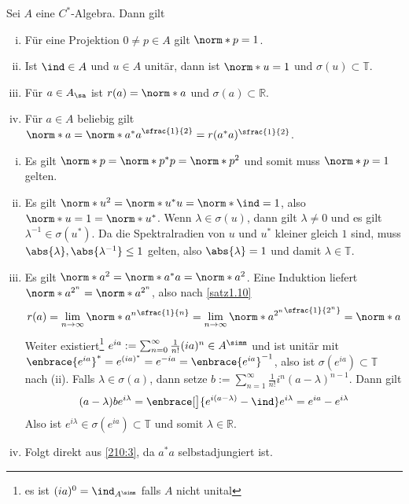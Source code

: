 \begin{proposition}[label=prop:210,{name=[Eigenschaften von Projektionen, unitären und selbstadjungierten Elementen]}]
	Sei $A$ eine $C^*$-Algebra. Dann gilt
	\begin{enumerate}[(i),itemsep=0pt]
		\item Für eine Projektion $0 \neq p  \in A$ gilt $\norm*{p} =1$.
		\item Ist $\ind \in A$ und $u \in A$ unitär, dann ist $\norm*{u}=1$ und $\sigma(u) \subset \mathbb{T}$.
		\item \label{210:3} Für $a \in A_{\sa}$ ist $r(a)= \norm*{a}$ und $\sigma(a) \subset \mathbb{R}$.
		\item \label{210:4} Für $a \in A$ beliebig gilt $\norm*{a} = \norm*{a^* a}^{\sfrac{1}{2}}= r(a^* a)^{\sfrac{1}{2}}$.
	\end{enumerate}
\end{proposition}
\begin{beweis}
	\leavevmode
	\begin{enumerate}[(i),itemsep=0pt]
		\item Es gilt $\norm*{p} = \norm*{p^*p}= \norm*{p}^2$ und somit muss $\norm*{p}=1$ gelten.
		\item Es gilt $\norm*{u}^2= \norm*{u^* u}= \norm*{\ind}=1$, also $\norm*{u}=1=\norm*{u^*}$. 
		Wenn $\lambda \in \sigma(u)$, dann gilt $\lambda \neq 0$ und es gilt $\lambda^{-1} \in \sigma(u^*)$. 
		Da die Spektralradien von $u$ und $u^*$ kleiner gleich $1$ sind, muss $\abs{\lambda},\abs{\lambda^{-1}}\le 1$ gelten, also $\abs{\lambda}=1$ und damit $\lambda \in \mathbb{T}$.
		\item Es gilt $\norm*{a^2}= \norm*{a^* a}= \norm*{a}^2$. Eine Induktion liefert $\norm*{a^{2^n}}= \norm*{a}^{2^n}$, also nach \autoref{satz1.10} 
		\[
			r(a) = \lim_{n \to \infty} \norm*{a^n}^{\sfrac{1}{n}} = \lim_{n \to \infty} \norm*{a^{2^n}}^{\sfrac{1}{2^n}} = \norm*{a}
		\]
		Weiter existiert\footnote{es ist $(ia)^0 = \ind_{A^\simm}$ falls $A$ nicht unital} $e^{ia} := \sum_{n=0}^{\infty} \frac{1}{n!}(ia)^n \in A^\simm$ und ist unitär mit 
		\(
			\enbrace{e^{ia}}^* = e^{(ia)^*} = e^{-ia} = \enbrace{e^{ia}}^{-1}
		\), 
		also ist $\sigma(e^{ia}) \subset \mathbb{T}$ nach (ii). Falls $\lambda \in \sigma(a)$, dann setze $b := \sum_{n=1}^{\infty} \frac{1}{n!} i^n (a-\lambda)^{n-1}$. Dann gilt
		\[
			(a-\lambda) b e^{i \lambda} = \enbrace[\big]{e^{i(a-\lambda)}- \ind}e^{i \lambda} = e^{i a} - e^{i \lambda}
		\]
		Also ist $e^{i \lambda} \in \sigma(e^{ia}) \subset \mathbb{T}$ und somit $\lambda \in \mathbb{R}$.
		\item Folgt direkt aus \ref{210:3}, da $a^*a$ selbstadjungiert ist. \qedhere
	\end{enumerate}
\end{beweis}

